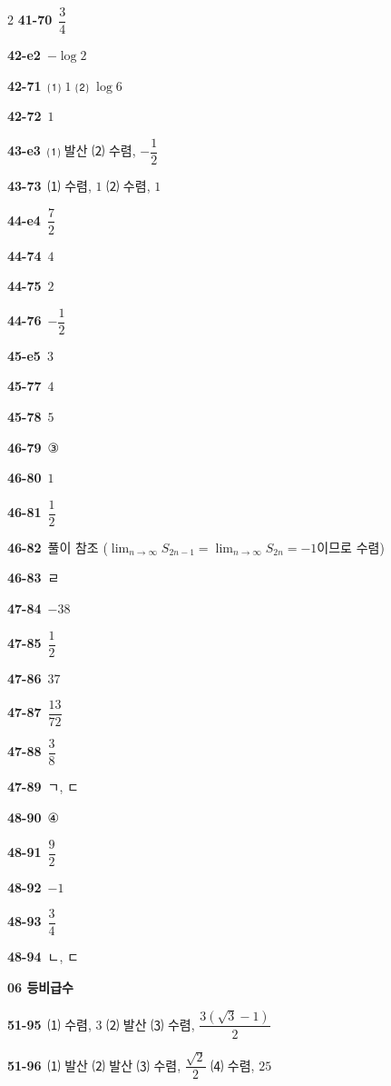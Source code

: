 \documentclass[10pt,a4paper]{article}
\begin{document}
\begin{multicols}{2}
\noindent\textbf{41-70}\ $\dfrac{3}{4}$\par
\noindent\textbf{42-e2}\ $-\log 2$\par
\noindent\textbf{42-71}\ ⑴ $1$ ⑵ $\log 6$\par
\noindent\textbf{42-72}\ $1$\par
\noindent\textbf{43-e3}\ ⑴ 발산 ⑵ 수렴, $-\dfrac{1}{2}$\par
\noindent\textbf{43-73}\ ⑴ 수렴, $1$ ⑵ 수렴, $1$\par
\noindent\textbf{44-e4}\ $\dfrac{7}{2}$\par
\noindent\textbf{44-74}\ $4$\par
\noindent\textbf{44-75}\ $2$\par
\noindent\textbf{44-76}\ $-\dfrac{1}{2}$\par
\noindent\textbf{45-e5}\ $3$\par
\noindent\textbf{45-77}\ $4$\par
\noindent\textbf{45-78}\ $5$\par
\noindent\textbf{46-79}\ ③\par
\noindent\textbf{46-80}\ $1$\par
\noindent\textbf{46-81}\ $\dfrac{1}{2}$\par
\noindent\textbf{46-82}\ 풀이 참조 ($\displaystyle\lim_{n\to\infty} S_{2n-1}=\displaystyle\lim_{n\to\infty} S_{2n}=-1$이므로 수렴)\par
\noindent\textbf{46-83}\ ㄹ\par
\noindent\textbf{47-84}\ $-38$\par
\noindent\textbf{47-85}\ $\dfrac{1}{2}$\par
\noindent\textbf{47-86}\ $37$\par
\noindent\textbf{47-87}\ $\dfrac{13}{72}$\par
\noindent\textbf{47-88}\ $\dfrac{3}{8}$\par
\noindent\textbf{47-89}\ ㄱ, ㄷ\par
\noindent\textbf{48-90}\ ④\par
\noindent\textbf{48-91}\ $\dfrac{9}{2}$\par
\noindent\textbf{48-92}\ $-1$\par
\noindent\textbf{48-93}\ $\dfrac{3}{4}$\par
\noindent\textbf{48-94}\ ㄴ, ㄷ\par
\noindent\textbf{06 등비급수}\par\smallskip
\noindent\textbf{51-95}\ ⑴ 수렴, $3$ ⑵ 발산 ⑶ 수렴, $\dfrac{3(\sqrt{3}-1)}{2}$\par
\noindent\textbf{51-96}\ ⑴ 발산 ⑵ 발산 ⑶ 수렴, $\dfrac{\sqrt{2}}{2}$ ⑷ 수렴, $25$\par

\end{multicols}
\end{document}
